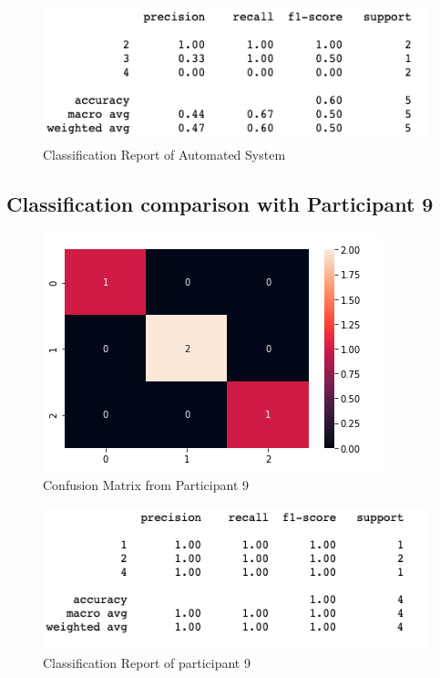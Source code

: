\begin{figure}[!htp]
    \includegraphics[width=\textwidth]{Images/a8r.png}
    \caption{Classification Report of Automated System}
    \label{fig:f11}
\end{figure}

\pagebreak
\subsection*{Classification comparison with Participant 9}

\begin{figure}[!htp]
    \includegraphics[width=\textwidth]{Images/p9.png}
    \caption{Confusion Matrix from Participant 9}
    \label{fig:f11}
\end{figure}

\begin{figure}[!htp]
    \includegraphics[width=\textwidth]{Images/p9r.png}
    \caption{Classification Report of participant 9}
    \label{fig:f11}
\end{figure}

